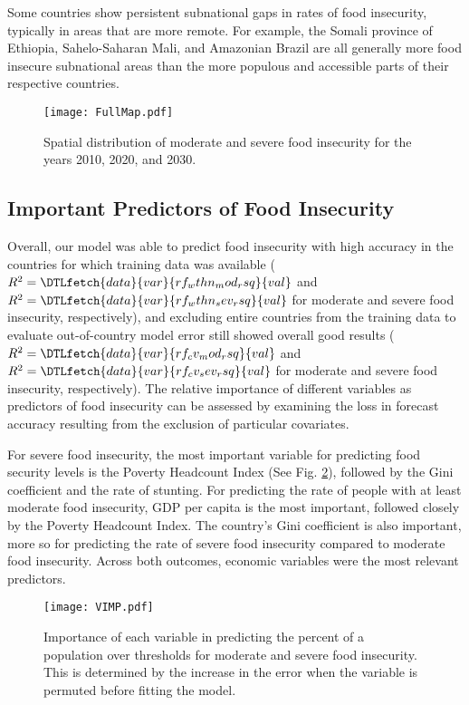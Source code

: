 \documentclass[titlepage]{article}
\newcommand{\myvar}[1]{\DTLfetch{data}{var}{#1}{val}}
\begin{document}
Some countries show persistent subnational gaps in rates of food insecurity, typically in areas that are more remote.  For example, the Somali province of Ethiopia, Sahelo-Saharan Mali, and Amazonian Brazil are all generally more food insecure subnational areas than the more populous and accessible parts of their respective countries.


\begin{landscape}
\begin{figure}[h]
  \centering
  \texttt{[image: FullMap.pdf]}
  \caption{Spatial distribution of moderate and severe food insecurity for the years 2010, 2020, and 2030.}
  \label{fig:map}
\end{figure}
\end{landscape}

\subsection{Important Predictors of Food Insecurity}
Overall, our model was able to predict food insecurity with high accuracy in the countries for which training data was available ($R^2 = \myvar{rf_wthn_mod_rsq}$ and $R^2 = \myvar{rf_wthn_sev_rsq}$ for moderate and severe food insecurity, respectively), and excluding entire countries from the training data to evaluate out-of-country model error still showed overall good results ($R^2 = \myvar{rf_cv_mod_rsq}$ and $R^2 = \myvar{rf_cv_sev_rsq}$ for moderate and severe food insecurity, respectively).  The relative importance of different variables as predictors of food insecurity can be assessed by examining the loss in forecast accuracy resulting from the exclusion of particular covariates.

For severe food insecurity, the most important variable for predicting food security levels is the Poverty Headcount Index (See Fig. \ref{fig:vimp}), followed by the Gini coefficient and the rate of stunting.  For predicting the rate of people with at least moderate food insecurity, GDP per capita is the most important, followed closely by the Poverty Headcount Index.  The country's Gini coefficient is also important, more so for predicting the rate of severe food insecurity compared to moderate food insecurity.  Across both outcomes, economic variables were the most relevant predictors.

\begin{figure}[h]
  \centering
  \texttt{[image: VIMP.pdf]}
  \caption{Importance of each variable in predicting the percent of a population over thresholds for moderate and severe food insecurity.  This is determined by the increase in the error when the variable is permuted before fitting the model.}
  \label{fig:vimp}
\end{figure}
\end{document}
